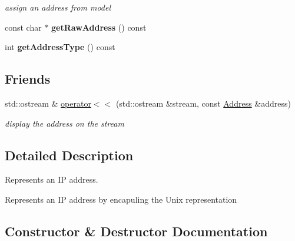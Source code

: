 \begin{DoxyCompactItemize}
\begin{DoxyCompactList}\small\item\em assign an address from \textquotesingle{}model\textquotesingle{} \end{DoxyCompactList}\item 
\hypertarget{classFTP_1_1IP_1_1Address_ab3fc1258d32aad9f62e05cc8addc7e4a}{}const char $\ast$ {\bfseries get\+Raw\+Address} () const \label{classFTP_1_1IP_1_1Address_ab3fc1258d32aad9f62e05cc8addc7e4a}

\item 
\hypertarget{classFTP_1_1IP_1_1Address_a698468c4084d89b0e3517763b5c9e76f}{}int {\bfseries get\+Address\+Type} () const \label{classFTP_1_1IP_1_1Address_a698468c4084d89b0e3517763b5c9e76f}

\end{DoxyCompactItemize}
\subsection*{Friends}
\begin{DoxyCompactItemize}
\item 
\hypertarget{classFTP_1_1IP_1_1Address_a36fedfa6e623cc0068e4b839b9cca38a}{}std\+::ostream \& \hyperlink{classFTP_1_1IP_1_1Address_a36fedfa6e623cc0068e4b839b9cca38a}{operator$<$$<$} (std\+::ostream \&stream, const \hyperlink{classFTP_1_1IP_1_1Address}{Address} \&address)\label{classFTP_1_1IP_1_1Address_a36fedfa6e623cc0068e4b839b9cca38a}

\begin{DoxyCompactList}\small\item\em display the address on the stream \end{DoxyCompactList}\end{DoxyCompactItemize}


\subsection{Detailed Description}
Represents an I\+P address. 

Represents an I\+P address by encapuling the Unix representation 

\subsection{Constructor \& Destructor Documentation}
\hypertarget{classFTP_1_1IP_1_1Address_a6d18d47e09493c961921214e24bf5a16}{}
